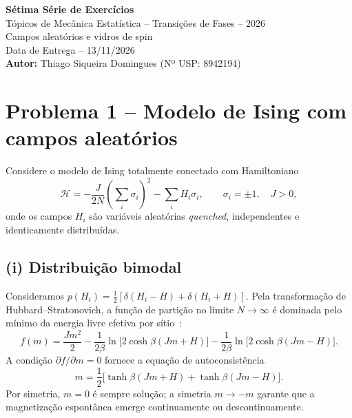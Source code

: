 \documentclass[12pt,a4paper]{article}
\begin{document}
%
\begin{center}
    {\Large\bfseries Sétima Série de Exercícios}\\[0.6cm]
    {\large Tópicos de Mecânica Estatística -- Transições de Fases -- 2026}\\[0.2cm]
    {\large Campos aleatórios e vidros de spin}\\[0.2cm]
    {\large Data de Entrega -- 13/11/2026}\\[0.2cm]
    {\Large \textbf{Autor:} Thiago Siqueira Domingues (Nº USP: 8942194)}
\end{center}
\section*{Problema 1 -- Modelo de Ising com campos aleatórios}

Considere o modelo de Ising totalmente conectado com Hamiltoniano
%
\begin{equation}
    \mathcal{H}
    =
    -\frac{J}{2N}
    \left(\sum_{i}\sigma_i\right)^2
    -\sum_{i}H_i\sigma_i,
    \qquad \sigma_i=\pm1,\quad J>0,
    \label{eq:rfim_H}
\end{equation}
%
onde os campos $H_i$ são variáveis aleatórias \emph{quenched},
independentes e identicamente distribuídas.

\subsection*{(i) Distribuição bimodal}

Consideramos $p(H_i)=\tfrac{1}{2}[\delta(H_i-H)+\delta(H_i+H)]$.
Pela transformação de Hubbard--Stratonovich, a função de partição
no limite $N\to\infty$ é dominada pelo mínimo da energia livre
efetiva por sítio~\cite{Aharony1978a}:
%
\begin{equation}
    f(m)
    =
    \frac{Jm^2}{2}
    -\frac{1}{2\beta}\ln\bigl[2\cosh\beta(Jm+H)\bigr]
    -\frac{1}{2\beta}\ln\bigl[2\cosh\beta(Jm-H)\bigr].
    \label{eq:free_energy_bimodal}
\end{equation}
%
A condição $\partial f/\partial m=0$ fornece a equação de autoconsistência
%
\begin{equation}
    \boxed{
    m
    =
    \frac{1}{2}\bigl[
        \tanh\beta(Jm+H)
        +
        \tanh\beta(Jm-H)
    \bigr].
    }
    \label{eq:self_consistency_bimodal}
\end{equation}
%
Por simetria, $m=0$ é sempre solução; a simetria $m\to-m$ garante
que a magnetização espontânea emerge continuamente ou descontinuamente.
\end{document}
